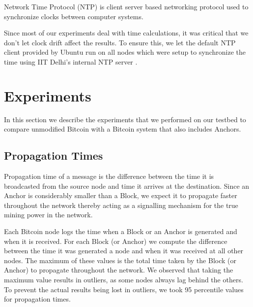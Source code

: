 Network Time Protocol (NTP) is client server based networking protocol used to synchronize clocks between computer systems.

Since most of our experiments deal with time calculations, it was critical that we don't let clock drift affect the results. 
To ensure this, we let the default NTP client provided by Ubuntu run on all nodes which were setup to synchronize the time using IIT Delhi's internal NTP server \cite{iitdNTP}.


\newpage

\section{Experiments} \label{exp-exp}

In this section we describe the experiments that we performed on our testbed to compare unmodified Bitcoin with a Bitcoin system that also includes Anchors.



\subsection{Propagation Times} \label{exp-prop}

Propagation time of a message is the difference between the time it is broadcasted from the source node and time it arrives at the destination. 
Since an Anchor is considerably smaller than a Block, we expect it to propagate faster throughout the network thereby acting as a signalling mechanism for the true mining power in the network.

Each Bitcoin node logs the time when a Block or an Anchor is generated and when it is received. 
For each Block (or Anchor) we compute the difference between the time it was generated a node and when it was received at all other nodes. 
The maximum of these values is the total time taken by the Block (or Anchor) to propagate throughout the network.
We observed that taking the maximum value results in outliers, as some nodes always lag behind the others.
To prevent the actual results being lost in outliers, we took 95 percentile values for propagation times.

